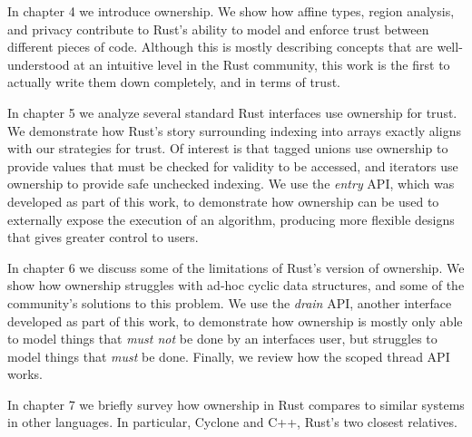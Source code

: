 In chapter 4 we introduce ownership. We show how affine types, region
analysis, and privacy contribute to Rust's ability to model and enforce trust
between different pieces of code. Although this is mostly describing concepts
that are well-understood at an intuitive level in the Rust community, this
work is the first to actually write them down completely, and in terms of
trust.

In chapter 5 we analyze several standard Rust interfaces use ownership for trust.
We demonstrate how Rust's story surrounding indexing into arrays exactly aligns
with our strategies for trust. Of interest is that tagged unions use ownership
to provide values that must be checked for validity to be accessed, and iterators
use ownership to provide safe unchecked indexing. We use the \emph{entry} API,
which was developed as part of this work, to demonstrate how ownership can be
used to externally expose the execution of an algorithm, producing more flexible
designs that gives greater control to users.

In chapter 6 we discuss some of the limitations of Rust's version of ownership.
We show how ownership struggles with ad-hoc cyclic data structures, and some
of the community's solutions to this problem. We use the \emph{drain} API,
another interface developed as part of this work, to demonstrate how ownership
is mostly only able to model things that \emph{must not} be done by an interfaces
user, but struggles to model things that \emph{must} be done. Finally, we review
how the scoped thread API works.

In chapter 7 we briefly survey how ownership in Rust compares to similar systems
in other languages. In particular, Cyclone and C++, Rust's two closest relatives.
